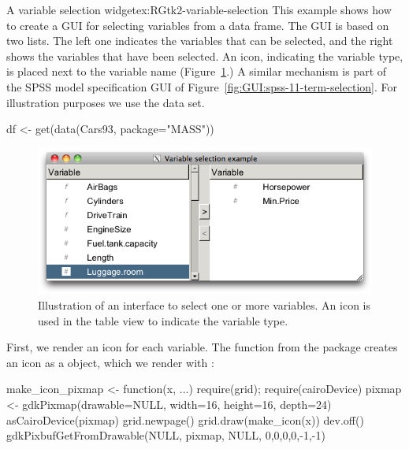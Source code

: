 \begin{example}{A variable selection widget}{ex:RGtk2-variable-selection}
This example shows how to create a GUI for selecting variables from a
data frame. The GUI is based on two lists. The left one indicates the
variables that can be selected, and the right shows the variables that
have been selected. An icon, indicating the variable type, is placed
next to the variable name (Figure~\ref{fig:RGtk2-select-variables}.) A
similar mechanism is part of the SPSS model specification GUI of
Figure~\ref{fig:GUI:spss-11-term-selection}. For illustration purposes
we use the  data set.
\begin{Schunk}
\begin{Sinput}
 df <- get(data(Cars93, package="MASS"))
\end{Sinput}
\end{Schunk}


\begin{figure}
  \centering
  \includegraphics[width=.8\textwidth]{fig-RGtk2-select-variables}
  \caption{Illustration of an interface to select one or more
    variables. An icon is used in the table view to indicate the
    variable type.}
  \label{fig:RGtk2-select-variables}
\end{figure}

First, we render an icon for each variable.  The 
function from the  package creates an icon as a
 object, which we render with :
% 
\begin{Schunk}
\begin{Sinput}
 make_icon_pixmap <- function(x, ...) {
   require(grid); require(cairoDevice)
   pixmap <- gdkPixmap(drawable=NULL, width=16, height=16, 
   depth=24)
   asCairoDevice(pixmap)
   grid.newpage()
   grid.draw(make_icon(x))
   dev.off()
   gdkPixbufGetFromDrawable(NULL, pixmap, NULL, 0,0,0,0,-1,-1)
 }
\end{Sinput}
\end{Schunk}


\end{example}
